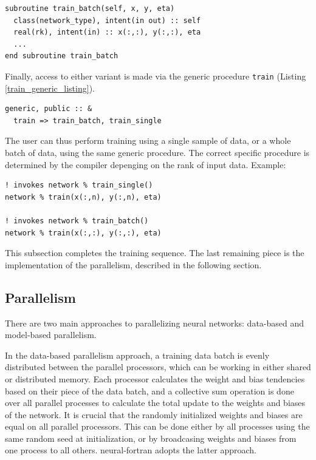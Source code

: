 \documentclass[sigplan, review=false, screen=true, balance=true]{acmart}
\begin{document}
\begin{lstlisting}[caption={A variant of the training method that accepts batches of data}, captionpos=b, label={train_batch_listing}]
subroutine train_batch(self, x, y, eta)
  class(network_type), intent(in out) :: self
  real(rk), intent(in) :: x(:,:), y(:,:), eta
  ...
end subroutine train_batch
\end{lstlisting}

Finally, access to either variant is made via the generic procedure
\lstinline{train} (Listing \ref{train_generic_listing}).

\begin{lstlisting}[caption={Overloading specific training procedures with a generic name}, captionpos=b, label={train_generic_listing}]
generic, public :: &
  train => train_batch, train_single
\end{lstlisting}

The user can thus perform training using a single sample of data,
or a whole batch of data, using the same generic procedure. The correct
specific procedure is determined by the compiler depenging on the rank of
input data. Example:

\begin{lstlisting}[caption={Using the generic training procedure with single samples and batches of data}, captionpos=b, label={train_generic_usage_listing}]
! invokes network % train_single()
network % train(x(:,n), y(:,n), eta)

! invokes network % train_batch()
network % train(x(:,:), y(:,:), eta)
\end{lstlisting}

This subsection completes the training sequence. The last remaining piece
is the implementation of the parallelism, described in the following section.

\subsection{Parallelism}

There are two main approaches to parallelizing neural networks:
data-based and model-based parallelism.

In the data-based parallelism approach, a training data batch is evenly distributed
between the parallel processors, which can be working in either
shared or distributed memory. Each processor calculates the weight and
bias tendencies based on their piece of the data batch, and a collective
sum operation is done over all parallel processes to calculate the
total update to the weights and biases of the network.
It is crucial that the randomly initialized weights and
biases are equal on all parallel processors.
This can be done either by all processes using the same random seed
at initialization, or by broadcasing weights and biases from one process to all
others. neural-fortran adopts the latter approach.
\end{document}
